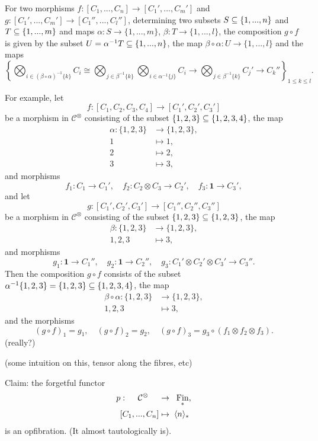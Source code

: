 \documentclass{MetricNotes2023}
\def\subq{\ensuremath\subseteq}
\DeclareMathOperator{\Fin}{Fin}
\begin{document}
For two morphisms \(f : [C_1, ..., C_n]\to [C_1', ..., C_m']\) and \(g : [C_1', ..., C_m']\to[C_1'', ..., C_l'']\), determining two subsets \(S \subq \{1, ..., n\}\) and \(T \subq \{1, ..., m\}\) and maps \(\alpha : S \to \{1, ..., m\}\), \(\beta : T \to \{1, ..., l\}\), the composition \(g \circ f\) is given by the subset \(U = \alpha^{-1}T \subq \{1, ..., n\}\), the map \(\beta \circ \alpha : U \to \{1, ..., l\}\) and the maps 
\[\left\{\bigotimes_{i \in (\beta \circ \alpha)^{-1}\{k\}} C_i \cong \bigotimes_{j \in \beta^{-1}\{k\}}\bigotimes_{i \in \alpha^{-1}\{j\}}C_i \to \bigotimes_{j \in \beta^{-1}\{k\}}C_j' \to C_k''\right\}_{1 \leq k \leq l}.\] 

For example, let 
\[f : [C_1, C_2, C_3, C_4]\to [C_1', C_2', C_3']\]
be a morphism in \(\mathcal{C}^\otimes\) consisting of the subset \(\{1, 2, 3\}\subq \{1, 2, 3, 4\}\), the map
\begin{align*}
\alpha : \{1, 2, 3\}&\to \{1, 2, 3\},\\
1 &\mapsto 1,\\
2 &\mapsto 2,\\
3 &\mapsto 3,
\end{align*}
and morphisms
\[f_1 : C_1 \to C_1', \quad f_2 : C_2 \otimes C_3 \to C_2', \quad f_3 : \textbf{1}\to C_3',\]
and let 
\[g : [C_1', C_2', C_3'] \to [C_1'', C_2'', C_3'']\]
be a morphism in \(\mathcal{C}^\otimes\) consisting of the subset \(\{1, 2, 3\}\subq \{1, 2, 3\}\), the map
\begin{align*}
\beta : \{1, 2, 3\}&\to \{1, 2, 3\},\\
1, 2, 3 &\mapsto 3,
\end{align*}
and morphisms
\[g_1 : \textbf{1} \to C_1'', \quad g_2 : \textbf{1} \to C_2'', \quad g_3 : C_1'\otimes C_2'\otimes C_3' \to C_3''.\]
Then the composition \(g \circ f \) consists of the subset \(\alpha^{-1}\{1, 2, 3\}=\{1, 2, 3\}\subq \{1, 2, 3, 4\}\), the map
\begin{align*}
\beta \circ \alpha : \{1, 2, 3\}&\to \{1, 2, 3\},\\
1, 2, 3 &\mapsto 3,
\end{align*}
and the morphisms
\[(g\circ f)_1 =g_1, \quad (g\circ f)_2 = g_2, \quad (g \circ f)_3 = g_3 \circ (f_1 \otimes f_2 \otimes f_3).\]
(really?)

(some intuition on this, tensor along the fibres, etc)

Claim: the forgetful functor
\begin{align*}
p : \quad\;\mathcal{C}^\otimes \quad\;&\to \;\;\Fin_*,\\
[C_1, ..., C_n] &\mapsto \;\ang{n}_*
\end{align*}
is an opfibration. (It almost tautologically is). 
\end{document}
